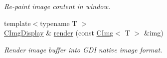 \begin{DoxyCompactItemize}
\begin{DoxyCompactList}\small\item\em Re-\/paint image content in window. \item\end{DoxyCompactList}\item 
\hypertarget{structcimg__library_1_1_c_img_display_a098a2963c267aa495ad36c4ee39bcbc5}{
{\footnotesize template$<$typename T $>$ }\\\hyperlink{structcimg__library_1_1_c_img_display}{CImgDisplay} \& \hyperlink{structcimg__library_1_1_c_img_display_a098a2963c267aa495ad36c4ee39bcbc5}{render} (const \hyperlink{structcimg__library_1_1_c_img}{CImg}$<$ T $>$ \&img)}
\label{structcimg__library_1_1_c_img_display_a098a2963c267aa495ad36c4ee39bcbc5}

\begin{DoxyCompactList}\small\item\em Render image buffer into GDI native image format. \item\end{DoxyCompactList}\end{DoxyCompactItemize}
